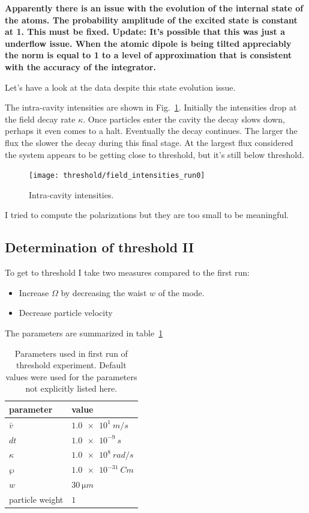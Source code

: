\documentclass[aps, superscriptaddress, groupedaddress, preprint]{revtex4}
\newcommand\note[1]{{\bf #1}}
\begin{document}
\note{Apparently there is an issue with the evolution of the
  internal state of the atoms.  The probability amplitude of the
  excited state is constant at 1.  This must be fixed.  Update:
  It's possible that this was just a underflow issue.  When the
  atomic dipole is being tilted appreciably the norm is equal to
  1 to a level of approximation that is consistent with the
  accuracy of the integrator.}

Let's have a look at the data despite this state evolution issue.

The intra-cavity intensities are shown in
Fig.~\ref{fig:FieldIntensities}.  Initially the intensities drop
at the field decay rate $\kappa$.  Once particles enter the
cavity the decay slows down, perhaps it even comes to a halt.
Eventually the decay continues.  The larger the flux the slower
the decay during this final stage.  At the largest flux
considered the system appears to be getting close to threshold,
but it's still below threshold.
\begin{figure}
  \texttt{[image: threshold/field\_intensities\_run0]}
  \caption{Intra-cavity intensities.}
  \label{fig:FieldIntensities}
\end{figure}

I tried to compute the polarizations but they are too small to be
meaningful.


\subsection{Determination of threshold II}

To get to threshold I take two measures compared to the first
run:
\begin{itemize}

\item Increase $\Omega$ by decreasing the waist $w$ of the mode.

\item Decrease particle velocity

\end{itemize}
The parameters are summarized in table~\ref{tab:Run2Params}
\begin{table}
  \begin{tabular}{|l|l|}
    \hline
    parameter       & value\\
    \hline
    \hline
    $\bar v$        & $\SI{1.0e1}{m/s}$\\
    \hline
    $dt$            & $\SI{1.0e-9}{s}$\\
    \hline
    $\kappa$        & $\SI{1.0e8}{rad/s}$\\
    \hline
    $\wp$           & $\SI{1.0e-31}{Cm}$\\
    \hline
    $w$             & $\SI{30}{\micro m}$\\
    \hline
    particle weight & $1$\\
    \hline
  \end{tabular}
  \caption{Parameters used in first run of threshold experiment.
    Default values were used for the parameters not explicitly
    listed here.}
  \label{tab:Run2Params}
\end{table}
\end{document}
